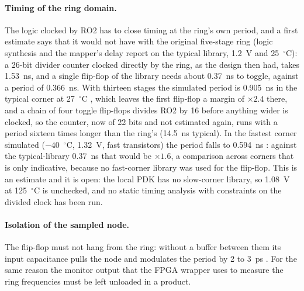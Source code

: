 \paragraph{Timing of the ring domain.} The logic clocked by RO2 has to
close timing at the ring's own period, and a first estimate says that
it would not have with the original five-stage ring \est{} (logic
synthesis and the mapper's delay report on the typical library, 1.2~V
and 25~$^\circ$C): a 26-bit divider counter clocked directly by the
ring, as the design then had, takes 1.53~ns, and a
single flip-flop of the library needs about 0.37~ns to toggle, against
a period of 0.366~ns. With thirteen stages the simulated period is
0.905~ns in the typical corner at 27~$^\circ$C \simu{}, which leaves the
first flip-flop a margin of $\times2.4$ there, and a chain of
four toggle flip-flops divides RO2 by 16 before anything wider is
clocked, so the counter, now of 22 bits and not estimated again, runs
with a period sixteen times longer than the ring's (14.5~ns typical).
In the fastest corner simulated ($-40$~$^\circ$C, 1.32~V, fast
transistors) the period falls to 0.594~ns \simu{}: against the
typical-library 0.37~ns that would be $\times1.6$, a comparison across
corners that is only indicative, because no fast-corner library was
used for the flip-flop. This is an
estimate and it is open: the local \ac{PDK} has no slow-corner library,
so 1.08~V at 125~$^\circ$C is unchecked, and no static timing analysis
with constraints on the divided clock has been run.

\paragraph{Isolation of the sampled node.} The flip-flop must not hang
from the ring: without a buffer between them its input capacitance pulls
the node and modulates the period by 2 to 3~ps \simu{}. For the same
reason the monitor output that the \ac{FPGA} wrapper uses to measure the
ring frequencies must be left unloaded in a product.

